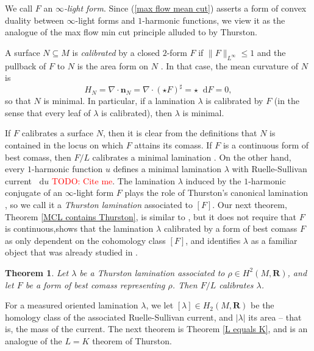 \documentclass[reqno,11pt]{amsart}
\newcommand{\RR}{\mathbf{R}}
\newcommand*\dif{\mathop{}\!\mathrm{d}}
\newcommand{\normal}{\mathbf n}
\newcommand{\dfn}[1]{\emph{#1}\index{#1}}
\newtheorem{mainthm}{Theorem}
\theoremstyle{definition}
\numberwithin{equation}{section}
\newcommand\todo[1]{\textcolor{red}{TODO: #1}}
\begin{document}
We call $F$ an \dfn{$\infty$-light form}.
Since (\ref{max flow mean cut}) asserts a form of convex duality between $\infty$-light forms and $1$-harmonic functions, we view it as the analogue of the max flow min cut principle alluded to by Thurston.

A surface $N \subseteq M$ is \dfn{calibrated} by a closed $2$-form $F$ if $\|F\|_{L^\infty} \leq 1$ and the pullback of $F$ to $N$ is the area form on $N$ \cite{Harvey82}.
In that case, the mean curvature of $N$ is 
\begin{equation}\label{calibrated surfaces are minimal}
H_N = \nabla \cdot \normal_N = \nabla \cdot (\star F)^\sharp = \star \dif F = 0,
\end{equation}
so that $N$ is minimal. 
In particular, if a lamination $\lambda$ is calibrated by $F$ (in the sense that every leaf of $\lambda$ is calibrated), then $\lambda$ is minimal.

If $F$ calibrates a surface $N$, then it is clear from the definitions that $N$ is contained in the locus on which $F$ attains its comass.
If $F$ is a continuous form of best comass, then $F/L$ calibrates a minimal lamination \cite{bangert_cui_2017}.
On the other hand, every $1$-harmonic function $u$ defines a minimal lamination $\lambda$ with Ruelle-Sullivan current $\dif u$ \todo{Cite me}.
The lamination $\lambda$ induced by the $1$-harmonic conjugate of an $\infty$-light form $F$ plays the role of Thurston's canonical lamination \cite{Thurston98}, so we call it a \dfn{Thurston lamination} associated to $[F]$.
Our next theorem, Theorem \ref{MCL contains Thurston}, is similar to \cite[Theorem 5.1]{bangert_cui_2017}, but it does not require that $F$ is continuous,shows that the lamination $\lambda$ calibrated by a form of best comass $F$ as only dependent on the cohomology class $[F]$, and identifies $\lambda$ as a familiar object that was already studied in \cite{daskalopoulos2020transverse}.

\begin{mainthm}
Let $\lambda$ be a Thurston lamination associated to $\rho \in H^2(M, \RR)$, and let $F$ be a form of best comass representing $\rho$.
Then $F/L$ calibrates $\lambda$. 
\end{mainthm}

For a measured oriented lamination $\lambda$, we let $[\lambda] \in H_2(M, \RR)$ be the homology class of the associated Ruelle-Sullivan current, and $|\lambda|$ its area -- that is, the mass of the current.
The next theorem is Theorem \ref{L equals K}, and is an analogue of the $L = K$ theorem of Thurston.
\end{document}
